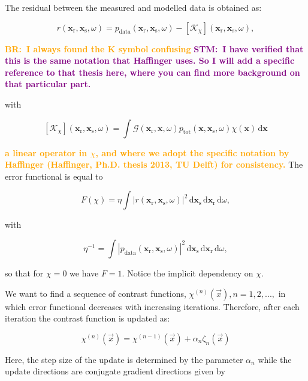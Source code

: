 \documentclass[10pt,a4paper]{article}
\newcommand{\df}[1]{\, \ensuremath{\mbox{d}#1}}
\newcommand{\commentstmtwo}[1]{\textcolor{purple}{\textbf{STM:\ #1}}}
\newcommand{\newstmtwo}[1]{\textcolor{orange}{\textbf{#1}}}
\newcommand{\commentbr}[1]{\textcolor{orange}{\textbf{BR:\ #1}}}
\newcommand{\xs}{\mathbf{x}_\text{s}}
\newcommand{\xr}{\mathbf{x}_\text{r}}
\newcommand{\x}{\mathbf{x}}
\begin{document}
The residual between the measured and modelled data is obtained as:

\begin{equation} \label{eq:eq9} r(\xr, \xs, \omega) =
p_{\text{data}}(\xr, \xs, \omega) - \left[\mathcal{K}_\chi
\right](\xr, \xs, \omega), \end{equation}

\commentbr{I always found the K symbol confusing}
\commentstmtwo{I have verified that this is the same notation that
Haffinger uses. So I will add a specific reference to that thesis
here, where you can find more background on that particular part.}

with

\begin{equation} \label{eq:eq10} \left[\mathcal{K}_\chi \right](\xr,
\xs, \omega) = \int \mathcal{G}(\xr, \x, \omega) p_\text{tot}(\x, \xs,
\omega) \chi(\x) \df{\x} \end{equation}

\newstmtwo{a linear operator in $\chi$, and where we adopt the specific notation
by Haffinger (Haffinger, Ph.D. thesis 2013, TU Delft) for consistency.}
The error functional is equal to

\begin{equation} \label{eq:eq11} F(\chi) = \eta \int |r(\xr, \xs,
\omega)|^2 \df{\mathbf{x}_\text{s}} \df{\xr}
\df{\omega},\end{equation}

with

\begin{equation} \label{eq:eq12} \eta^{-1} = \int | p_\text{data}(\xr,
\xs, \omega) |^2 \df{\xs} \df{\xr} \df{\omega}, \end{equation}

so that for $\chi = 0$ we have $F = 1$. Notice the implicit dependency
on $\chi$.

We want to find a sequence of contrast functions,
$\chi^{(n)}(\vec{x}), n = 1,2,...,$ in which error functional
decreases with increasing iterations. Therefore, after each iteration
the contrast function is updated as:

\begin{equation} \label{eq:eq13} \chi^{(n)}(\vec{x}) =
\chi^{(n-1)}(\vec{x}) + \alpha_n\zeta_n(\vec{x}) \end{equation}

Here, the step size of the update is determined by the parameter
$\alpha_n$ while the update directions are conjugate gradient
directions given by
\end{document}

